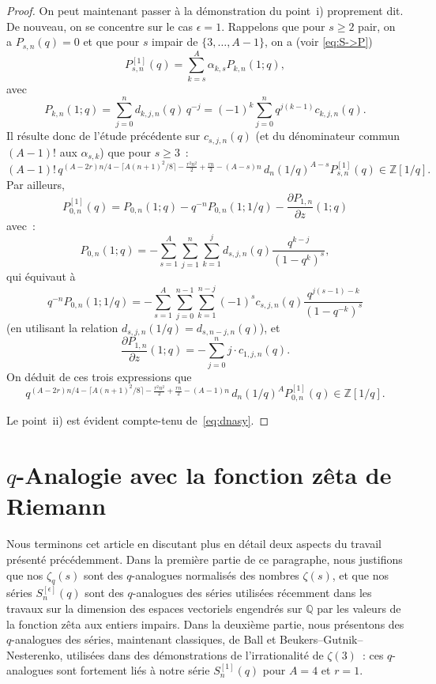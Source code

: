 \documentclass[12pt]{amsart}
\newcommand{\al}{\alpha}
\newcommand{\ep}{\epsilon}
\theoremstyle{remark}
\numberwithin{equation}{section}
\begin{document}
\begin{proof}
On peut maintenant passer {\`a} la d{\'e}monstration du point~i)
proprement dit. De nouveau, on se concentre sur le cas $\ep=1$. 
Rappelons que pour $s\ge 2$ pair, on a $P_{s,n}(q)=0$ et que 
pour $s$ impair de $\{3, \ldots, A-1\}$, on a (voir \eqref{eq:S->P})
$$
\displaystyle P_{s,n}^{[1]}(q)=\sum_{k=s}^{A}\alpha_{k,s}P_{k,n}(1;q),
$$
avec 
$$
P_{k,n}(1;q)=\sum_{j=0}^n d_{k,j,n}(q)\,q^{-j} =
(-1)^k\sum_{j=0}^n 
q^{j(k-1)}c_{k,j,n}(q).
$$
Il r{\'e}sulte donc de l'{\'e}tude pr{\'e}c{\'e}dente sur $c_{s,j,n}(q)$ 
(et du d{\'e}nominateur commun $(A-1)!$ aux
$\al_{s,k}$) que pour $s\ge 3$~:
$$
(A-1)!\, q^{(A-2r)n/4-\lceil A (n+1)^2/8\rceil
-\frac {r^2n^2} {2}+\frac {rn} {2}- (A-s) n}\,
d_n(1/q)^{A-s} P_{s,n}^{[1]}(q)\in\mathbb{Z}[1/q].
$$
Par ailleurs,  
$$
\displaystyle P_{0,n}^{[1]}(q)=P_{0,n}(1;q)-
q^{-n}P_{0,n}(1;1/q)-\frac{\partial P_{1,n} }{\partial z}(1;q)
$$
avec~:
\begin{equation*}
P_{0,n}(1;q)
=-\sum_{s=1}^A\sum_{j=1}^n\sum_{k=1}^j
d_{s,j,n}(q)\frac {q^{k-j}} {(1-q^k)^s},
\end{equation*}
qui {\'e}quivaut {\`a}
\begin{equation*}
q^{-n}P_{0,n}(1;1/q)
=-\sum_{s=1}^A\sum_{j=0}^{n-1}\sum_{k=1}^{n-j}
(-1)^s c_{s,j,n}(q)\frac{q^{j(s-1)-k}}{(1-q^{-k})^s}
\end{equation*}
(en utilisant la relation $d_{s,j,n}(1/q)=d_{s,n-j,n}(q)$), et 
$$
\frac{\partial P_{1,n} }{\partial z}(1;q)=
-\sum _{j=0} ^{n}j\cdot c_{1,j,n}(q).
$$
On d{\'e}duit de ces trois expressions que 
$$
q^{(A-2r)n/4-\lceil A (n+1)^2/8\rceil
-\frac {r^2n^2} {2}+\frac {rn} {2}- (A-1)n}\,
d_n(1/q)^{A}P_{0,n}^{[1]}(q)\in\mathbb{Z}[1/q].
$$

Le point~ii) est {\'e}vident compte-tenu de~\eqref{eq:dnasy}.
\end{proof}





\section{$q$-Analogie avec la fonction z{\^e}ta de Riemann}
\label{sec:qanalogiezeta}

Nous terminons cet article en discutant plus en d{\'e}tail deux aspects 
du travail pr{\'e}sent{\'e} pr{\'e}c{\'e}demment. 
Dans la premi{\`e}re partie de ce paragraphe,  
nous justifions que nos $\zeta_q(s)$ sont des 
$q$-analogues normalis{\'e}s des nombres $\zeta(s)$, et que nos
s{\'e}ries $S^{[\ep]}_n(q)$ sont des $q$-analogues des s{\'e}ries   
utilis{\'e}es r{\'e}cemment dans les travaux sur la dimension
des espaces vectoriels engendr{\'e}s sur $\mathbb Q$ par les valeurs de
la fonction z{\^e}ta aux entiers impairs. Dans la deuxi{\`e}me partie, 
nous pr{\'e}sentons des $q$-analogues des s{\'e}ries, maintenant 
classiques, de Ball et Beukers--Gutnik--Nesterenko, utilis{\'e}es
dans des d{\'e}monstrations de l'irrationalit{\'e} de $\zeta(3)$~: 
ces $q$-analogues 
sont fortement li{\'e}s  {\`a} notre s{\'e}rie $S^{[1]}_n(q)$ pour $A=4$ 
et $r=1$.
\end{document}
